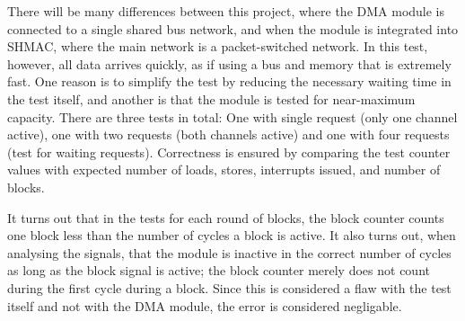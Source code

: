 \begin{appendix}
\begin{description}
    There will be many differences between this project, where the DMA module is connected to a single shared bus network, and when the module is integrated into SHMAC, where the main network is a packet-switched network.
    In this test, however, all data arrives quickly, as if using a bus and memory that is extremely fast.
    One reason is to simplify the test by reducing the necessary waiting time in the test itself, and another is that the module is tested for near-maximum capacity.
    There are three tests in total: One with single request (only one channel active), one with two requests (both channels active) and one with four requests (test for waiting requests).
    Correctness is ensured by comparing the test counter values with expected number of loads, stores, interrupts issued, and number of blocks.
    
    It turns out that in the tests for each round of blocks, the block counter counts one block less than the number of cycles a block is active. It also turns out, when analysing the signals, that the module is inactive in the correct number of cycles as long as the block signal is active; the block counter merely does not count during the first cycle during a block. Since this is considered a flaw with the test itself and not with the DMA module, the error is considered negligable. 
\end{description}


\end{appendix}

